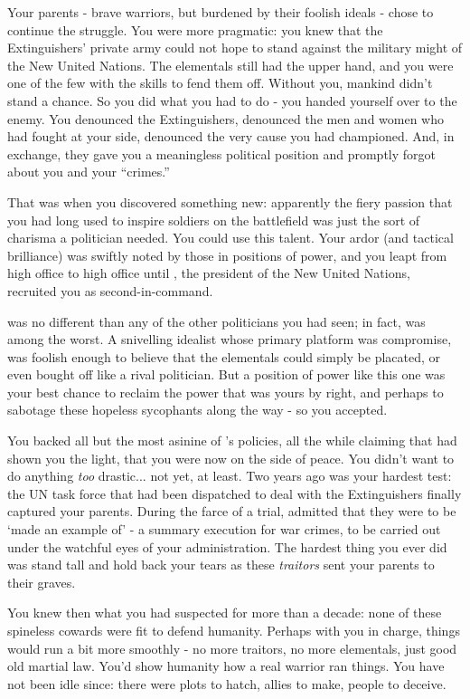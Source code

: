 \documentclass[char]{elementals}
\begin{document}
Your parents - brave warriors, but burdened by their foolish ideals - chose to continue the struggle. You were more pragmatic: you knew that the Extinguishers’ private army could not hope to stand against the military might of the New United Nations. The elementals still had the upper hand, and you were one of the few with the skills to fend them off. Without you, mankind didn’t stand a chance. So you did what you had to do - you handed yourself over to the enemy. You denounced the Extinguishers, denounced the men and women who had fought at your side, denounced the very cause you had championed. And, in exchange, they gave you a meaningless political position and promptly forgot about you and your “crimes.”

That was when you discovered something new: apparently the fiery passion that you had long used to inspire soldiers on the battlefield was just the sort of charisma a politician needed. You could use this talent. Your ardor (and tactical brilliance) was swiftly noted by those in positions of power, and you leapt from high office to high office until \cLeader{} \cLeader{\themself}, the president of the New United Nations, recruited you as \cLeader{\their} second-in-command.

\cLeader{} was no different than any of the other politicians you had seen; in fact, \cLeader{\they} was among the worst. A snivelling idealist whose primary platform was compromise, \cLeader{\they} was foolish enough to believe that the elementals could simply be placated, or even bought off like a rival politician. But a position of power like this one was your best chance to reclaim the power that was yours by right, and perhaps to sabotage these hopeless sycophants along the way - so you accepted. 

You backed all but the most asinine of \cLeader{}’s policies, all the while claiming that \cLeader{\they} had shown you the light, that you were now on the side of peace. You didn’t want to do anything \emph{too} drastic... not yet, at least. Two years ago was your hardest test: the UN task force that had been dispatched to deal with the Extinguishers finally captured your parents. During the farce of a trial, \cLeader{} admitted that they were to be ‘made an example of’ - a summary execution for war crimes, to be carried out under the watchful eyes of your administration. The hardest thing you ever did was stand tall and hold back your tears as these \emph{traitors} sent your parents to their graves.

You knew then what you had suspected for more than a decade: none of these spineless cowards were fit to defend humanity. Perhaps with you in charge, things would run a bit more smoothly - no more traitors, no more elementals, just good old martial law. You’d show humanity how a real warrior ran things. You have not been idle since: there were plots to hatch, allies to make, people to deceive. 
\end{document}
